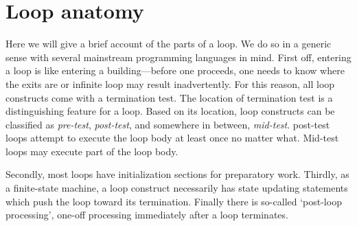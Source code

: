 \section{Loop anatomy}\label{sec:loopAnatomy}


Here we will give a brief account of the parts of a loop.
We do so in a generic sense with several mainstream programming languages in mind.
First off, entering a loop is like entering a building---before one proceeds, one needs to know
where the exits are or infinite loop may result inadvertently.
For this reason, all loop constructs come with a termination test.
The location of termination test is a distinguishing feature for a loop.
Based on its location, loop constructs can be classified as \emph{pre-test}, \emph{post-test},
and somewhere in between, \emph{mid-test}.
post-test loops attempt to execute the loop body at least once no matter what.
Mid-test loops may execute part of the loop body.


Secondly, most loops have initialization sections for preparatory work.
Thirdly, as a finite-state machine, a loop construct necessarily has state updating statements
which push the loop toward its termination.
Finally there is so-called `post-loop processing', one-off processing immediately after a loop
terminates.


